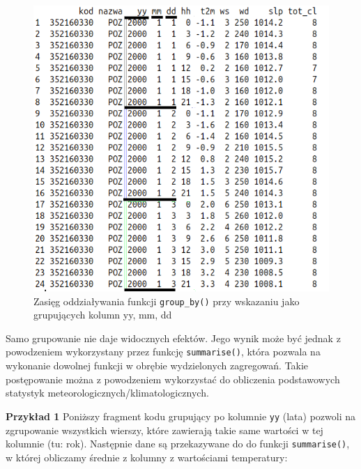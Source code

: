 \documentclass[]{book}
\newenvironment{Shaded}{\begin{snugshade}}{\end{snugshade}}
\newcommand{\KeywordTok}[1]{\textcolor[rgb]{0.13,0.29,0.53}{\textbf{#1}}}
\newcommand{\StringTok}[1]{\textcolor[rgb]{0.31,0.60,0.02}{#1}}
\newcommand{\OperatorTok}[1]{\textcolor[rgb]{0.81,0.36,0.00}{\textbf{#1}}}
\newcommand{\NormalTok}[1]{#1}
\theoremstyle{definition}
\theoremstyle{definition}
\theoremstyle{definition}
\theoremstyle{remark}
\begin{document}
\begin{figure}
\centering
\includegraphics{figures/group_by.png}
\caption{Zasięg oddziaływania funkcji \texttt{group\_by()} przy
wskazaniu jako grupujących kolumn yy, mm, dd}
\end{figure}

Samo grupowanie nie daje widocznych efektów. Jego wynik może być jednak
z powodzeniem wykorzystany przez funkcję \texttt{summarise()}, która
pozwala na wykonanie dowolnej funkcji w obrębie wydzielonych zagregowań.
Takie postępowanie można z powodzeniem wykorzystać do obliczenia
podstawowych statystyk meteorologicznych/klimatologicznych.

\textbf{Przykład 1} Poniższy fragment kodu grupujący po kolumnie
\texttt{yy} (lata) pozwoli na zgrupowanie wszystkich wierszy, które
zawierają takie same wartości w tej kolumnie (tu: rok). Następnie dane
są przekazywane do do funkcji \texttt{summarise()}, w której obliczamy
średnie z kolumny z wartościami temperatury:

\begin{Shaded}
\end{Shaded}
\end{document}
